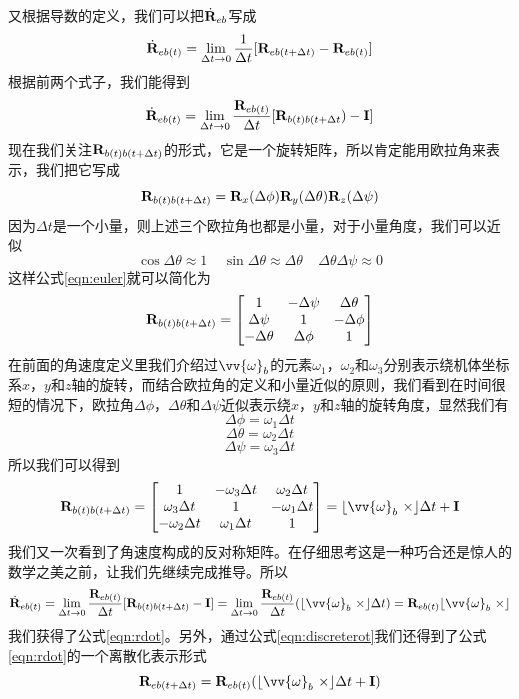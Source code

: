\documentclass[11pt]{article}
\begin{document}
又根据导数的定义，我们可以把$\dot{{\bf R}}_{eb}$写成
$$
\dot{{\bf R}}_{eb(t)} = \lim_{\Delta t \to 0}\frac{1}{\Delta t}[{\bf R}_{eb(t+\Delta t)} - {\bf R}_{eb(t)}]
$$
根据前两个式子，我们能得到
$$
\dot{{\bf R}}_{eb(t)} = \lim_{\Delta t \to 0}\frac{{\bf R}_{eb(t)}}{\Delta t}[{\bf R}_{b(t)b(t+\Delta t}) - {\bf I}]
$$
现在我们关注${\bf R}_{b(t)b(t+\Delta t)}$的形式，它是一个旋转矩阵，所以肯定能用欧拉角来表示，我们把它写成
$$
{\bf R}_{b(t)b(t+\Delta t)} = {\bf R}_x(\Delta\phi){\bf R}_y(\Delta\theta){\bf R}_z(\Delta\psi)
$$
因为$\Delta t$是一个小量，则上述三个欧拉角也都是小量，对于小量角度，我们可以近似
$$
\cos\Delta\theta \approx 1 \ \ \ \ \ \sin\Delta\theta \approx \Delta\theta \ \ \ \ \ \Delta\theta\Delta\psi \approx 0
$$
这样公式\ref{eqn:euler}就可以简化为
$$
{\bf R}_{b(t)b(t+\Delta t)} =
\begin{bmatrix}
1 & -\Delta\psi & \Delta\theta\\
\Delta\psi & 1 & -\Delta\phi \\
-\Delta\theta & \Delta\phi & 1
\end{bmatrix} 
$$
在前面的角速度定义里我们介绍过$\vv{\omega}_b$的元素$\omega_1$，$\omega_2$和$\omega_3$分别表示绕机体坐标系$x$，$y$和$z$轴的旋转，而结合欧拉角的定义和小量近似的原则，我们看到在时间很短的情况下，欧拉角$\Delta\phi$，$\Delta\theta$和$\Delta\psi$近似表示绕$x$，$y$和$z$轴的旋转角度，显然我们有
$$
\Delta\phi = \omega_1\Delta t
$$
$$
\Delta\theta = \omega_2\Delta t
$$
$$
\Delta\psi = \omega_3\Delta t
$$
所以我们可以得到
\begin{equation}\label{eqn:infirot}
{\bf R}_{b(t)b(t+\Delta t)} =
\begin{bmatrix}
1 & -\omega_3\Delta t & \omega_2\Delta t\\
\omega_3\Delta t & 1 & -\omega_1\Delta t \\
-\omega_2\Delta t & \omega_1\Delta t & 1
\end{bmatrix} 
=
\lfloor \vv{\omega}_b \ \times \rfloor \Delta t + {\bf I} 
\end{equation}
我们又一次看到了角速度构成的反对称矩阵。在仔细思考这是一种巧合还是惊人的数学之美之前，让我们先继续完成推导。所以
$$
\dot{{\bf R}}_{eb(t)} = 
\lim_{\Delta t \to 0}\frac{{\bf R}_{eb(t)}}{\Delta t}[{\bf R}_{b(t)b(t+\Delta t)} - {\bf I}] 
=
\lim_{\Delta t \to 0}\frac{{\bf R}_{eb(t)}}{\Delta t}(\lfloor \vv{\omega}_b \ \times \rfloor \Delta t)
=
{\bf R}_{eb(t)}\lfloor \vv{\omega}_b \ \times \rfloor
$$
我们获得了公式\ref{eqn:rdot}。另外，通过公式\ref{eqn:discreterot}我们还得到了公式\ref{eqn:rdot}的一个离散化表示形式
\begin{equation}\label{eqn:discreterdot_euler}
{\bf R}_{eb(t+\Delta t)} = {\bf R}_{eb(t)}(\lfloor \vv{\omega}_b \ \times \rfloor \Delta t + {\bf I})
\end{equation}
\end{document}
